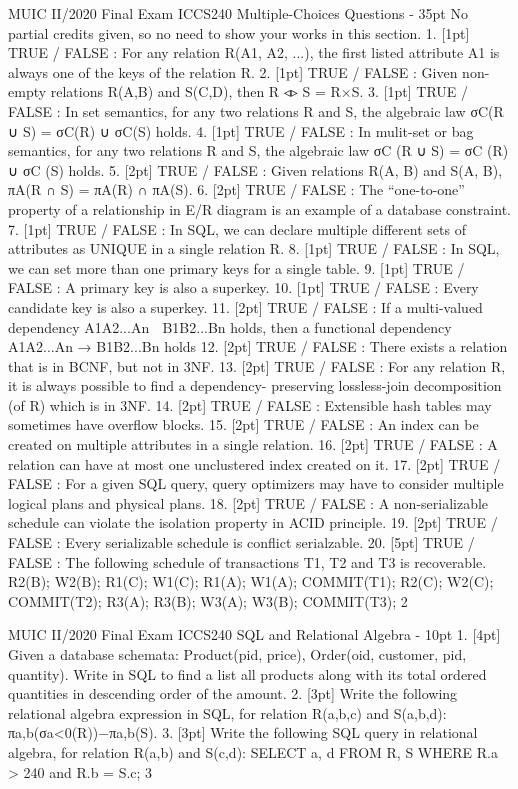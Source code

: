 \documentclass[a4paper, 11pt]{article}
\begin{document}
MUIC II/2020 Final Exam ICCS240
Multiple-Choices Questions - 35pt
No partial credits given, so no need to show your works in this section.
1. [1pt] TRUE / FALSE : For any relation R(A1, A2, ...), the first listed attribute A1 is always one of the keys of the relation R.
2. [1pt] TRUE / FALSE : Given non-empty relations R(A,B) and S(C,D), then R ◃▹ S = R×S.
3. [1pt] TRUE / FALSE : In set semantics, for any two relations R and S, the algebraic law σC(R ∪ S) = σC(R) ∪ σC(S) holds.
4. [1pt] TRUE / FALSE : In mulit-set or bag semantics, for any two relations R and S, the algebraic law σC (R ∪ S) = σC (R) ∪ σC (S) holds.
5. [2pt] TRUE / FALSE : Given relations R(A, B) and S(A, B), πA(R ∩ S) = πA(R) ∩ πA(S).
6. [2pt] TRUE / FALSE : The “one-to-one” property of a relationship in E/R diagram is an
example of a database constraint.
7. [1pt] TRUE / FALSE : In SQL, we can declare multiple different sets of attributes as
UNIQUE in a single relation R.
8. [1pt] TRUE / FALSE : In SQL, we can set more than one primary keys for a single table.
9. [1pt] TRUE / FALSE : A primary key is also a superkey.
10. [1pt] TRUE / FALSE : Every candidate key is also a superkey.
11. [2pt] TRUE / FALSE : If a multi-valued dependency A1A2...An 􏰀 B1B2...Bn holds, then
a functional dependency A1A2...An → B1B2...Bn holds
12. [2pt] TRUE / FALSE : There exists a relation that is in BCNF, but not in 3NF.
13. [2pt] TRUE / FALSE : For any relation R, it is always possible to find a dependency- preserving lossless-join decomposition (of R) which is in 3NF.
14. [2pt] TRUE / FALSE : Extensible hash tables may sometimes have overflow blocks.
15. [2pt] TRUE / FALSE : An index can be created on multiple attributes in a single relation.
16. [2pt] TRUE / FALSE : A relation can have at most one unclustered index created on it.
17. [2pt] TRUE / FALSE : For a given SQL query, query optimizers may have to consider multiple logical plans and physical plans.
18. [2pt] TRUE / FALSE : A non-serializable schedule can violate the isolation property in ACID principle.
19. [2pt] TRUE / FALSE : Every serializable schedule is conflict serialzable.
20. [5pt] TRUE / FALSE : The following schedule of transactions T1, T2 and T3 is recoverable. R2(B); W2(B); R1(C); W1(C); R1(A); W1(A); COMMIT(T1); R2(C); W2(C); COMMIT(T2); R3(A); R3(B); W3(A); W3(B); COMMIT(T3);
 2

MUIC II/2020 Final Exam ICCS240
SQL and Relational Algebra - 10pt
1. [4pt] Given a database schemata: Product(pid, price), Order(oid, customer, pid, quantity). Write in SQL to find a list all products along with its total ordered quantities in descending
order of the amount.
     2. [3pt] Write the following relational algebra expression in SQL, for relation R(a,b,c) and S(a,b,d): πa,b(σa<0(R))−πa,b(S).
    3. [3pt] Write the following SQL query in relational algebra, for relation R(a,b) and S(c,d): SELECT a, d FROM R, S WHERE R.a > 240 and R.b = S.c;
    3
\end{document}
